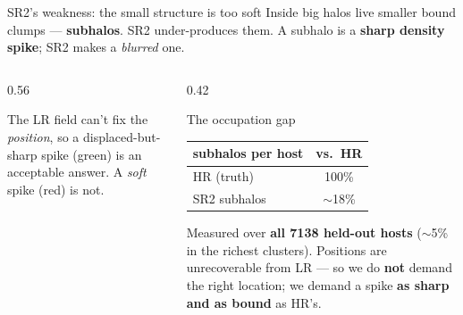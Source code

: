 \documentclass[aspectratio=169]{beamer}
\begin{document}
\begin{frame}{SR2's weakness: the small structure is too soft}
\small
Inside big halos live smaller bound clumps --- \textbf{subhalos}. SR2 under-produces them.
A subhalo is a \textbf{sharp density spike}; SR2 makes a \emph{blurred} one.

\vspace{0.1cm}
\begin{columns}[T]
\begin{column}{0.56\textwidth}
\centering
{}

\vspace{0.05cm}
{\scriptsize The LR field can't fix the \emph{position}, so a displaced-but-sharp
spike (green) is an acceptable answer. A \emph{soft} spike (red) is not.}
\end{column}
\begin{column}{0.42\textwidth}
\centering
\vspace{0.3cm}
\begin{block}{The occupation gap}
\centering
\begin{tabular}{lc}
\toprule
subhalos per host & vs.\ HR \\
\midrule
HR (truth) & 100\% \\
SR2 subhalos & \alert{$\sim$18\%} \\
\bottomrule
\end{tabular}
\end{block}
\footnotesize
Measured over \textbf{all 7138 held-out hosts} ($\sim$5\% in the richest clusters).
Positions are unrecoverable from LR --- so we do \textbf{not} demand the right location;
we demand a spike \textbf{as sharp and as bound} as HR's.
\end{column}
\end{columns}
\end{frame}
\end{document}
